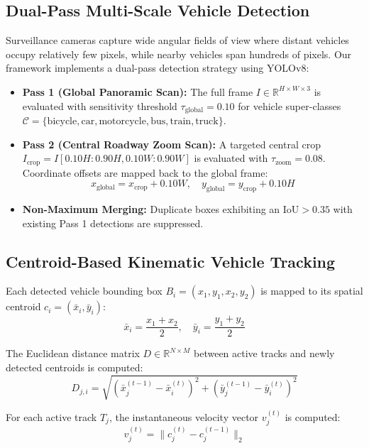 \documentclass[conference]{IEEEtran}
\begin{document}
\subsection{Dual-Pass Multi-Scale Vehicle Detection}
Surveillance cameras capture wide angular fields of view where distant vehicles occupy relatively few pixels, while nearby vehicles span hundreds of pixels. Our framework implements a dual-pass detection strategy using YOLOv8:
\begin{itemize}
    \item \textbf{Pass 1 (Global Panoramic Scan):} The full frame $I \in \mathbb{R}^{H \times W \times 3}$ is evaluated with sensitivity threshold $\tau_{\text{global}} = 0.10$ for vehicle super-classes $\mathcal{C} = \{\text{bicycle}, \text{car}, \text{motorcycle}, \text{bus}, \text{train}, \text{truck}\}$.
    \item \textbf{Pass 2 (Central Roadway Zoom Scan):} A targeted central crop $I_{\text{crop}} = I[0.10H : 0.90H, 0.10W : 0.90W]$ is evaluated with $\tau_{\text{zoom}} = 0.08$. Coordinate offsets are mapped back to the global frame:
    \begin{equation}
        x_{\text{global}} = x_{\text{crop}} + 0.10W, \quad y_{\text{global}} = y_{\text{crop}} + 0.10H
    \end{equation}
    \item \textbf{Non-Maximum Merging:} Duplicate boxes exhibiting an $\text{IoU} > 0.35$ with existing Pass 1 detections are suppressed.
\end{itemize}

\subsection{Centroid-Based Kinematic Vehicle Tracking}
Each detected vehicle bounding box $B_i = (x_1, y_1, x_2, y_2)$ is mapped to its spatial centroid $c_i = (\bar{x}_i, \bar{y}_i)$:
\begin{equation}
    \bar{x}_i = \frac{x_1 + x_2}{2}, \quad \bar{y}_i = \frac{y_1 + y_2}{2}
\end{equation}

The Euclidean distance matrix $D \in \mathbb{R}^{N \times M}$ between active tracks and newly detected centroids is computed:
\begin{equation}
    D_{j, i} = \sqrt{(\bar{x}_j^{(t-1)} - \bar{x}_i^{(t)})^2 + (\bar{y}_j^{(t-1)} - \bar{y}_i^{(t)})^2}
\end{equation}

For each active track $T_j$, the instantaneous velocity vector $v_j^{(t)}$ is computed:
\begin{equation}
    v_j^{(t)} = \|c_j^{(t)} - c_j^{(t-1)}\|_2
\end{equation}
\end{document}
